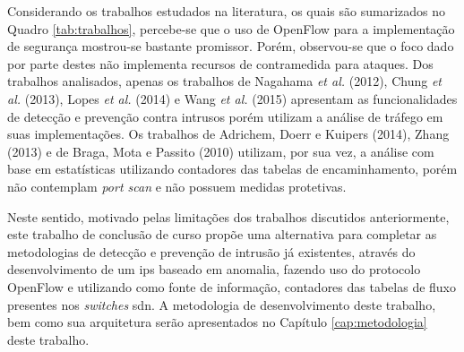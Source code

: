 Considerando os trabalhos estudados na literatura, os quais são sumarizados no Quadro \ref{tab:trabalhos}, percebe-se que o uso de OpenFlow para a implementação de segurança mostrou-se bastante promissor. Porém, observou-se que o foco dado por parte destes não implementa recursos de contramedida para ataques. Dos trabalhos analisados, apenas os trabalhos de Nagahama \textit{et al.} (2012)\nocite{Nagahama:2012}, Chung \textit{et al.} (2013)\nocite{Chung:2013}, Lopes \textit{et al.} (2014)\nocite{Lopez:2014} e Wang \textit{et al.} (2015)\nocite{Wang:2015} apresentam as funcionalidades de detecção e prevenção contra intrusos porém utilizam a análise de tráfego em suas implementações.
Os trabalhos de Adrichem, Doerr e Kuipers (2014)\nocite{Adrichem:2014}, Zhang (2013)\nocite{Zhang:2013} e de Braga, Mota e Passito (2010)\nocite{Braga:2010} utilizam, por sua vez, a análise com base em estatísticas utilizando contadores das tabelas de encaminhamento, porém não contemplam \textit{port scan} e não possuem medidas protetivas.

Neste sentido, motivado pelas limitações dos trabalhos discutidos anteriormente, este trabalho de conclusão de curso propõe uma alternativa para completar as metodologias de detecção e prevenção de intrusão já existentes, através do desenvolvimento de um \gls{ips} baseado em anomalia, fazendo uso do protocolo OpenFlow e utilizando como fonte de informação, contadores das tabelas de fluxo presentes nos \textit{switches} \gls{sdn}. A metodologia de desenvolvimento deste trabalho, bem como sua arquitetura serão apresentados no Capítulo \ref{cap:metodologia} deste trabalho.